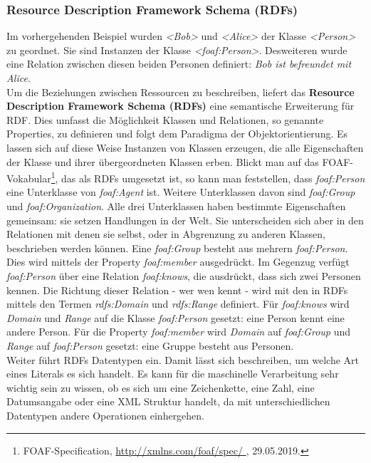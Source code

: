 \documentclass[12pt,a4paper]{article}
\begin{document}
\subsubsection{Resource Description Framework Schema (RDFs)}

Im vorhergehenden Beispiel wurden \textit{<Bob>} und \textit{<Alice>} der Klasse \textit{<Person>} zu geordnet. Sie sind Instanzen der Klasse \textit{<foaf:Person>}. Desweiteren wurde eine Relation zwischen diesen beiden Personen definiert: \textit{Bob ist befreundet mit Alice}.
\\
Um die Beziehungen zwischen Ressourcen zu beschreiben, liefert das \textbf{Resource Description Framework Schema (RDFs)} eine semantische Erweiterung für RDF. Dies umfasst die Möglichkeit Klassen und Relationen, so genannte Properties, zu definieren und folgt dem Paradigma der Objektorientierung. Es lassen sich auf diese Weise Instanzen von Klassen erzeugen, die alle Eigenschaften der Klasse und ihrer übergeordneten Klassen erben. Blickt man auf das FOAF-Vokabular\footnote{FOAF-Specification, \protect\url{http://xmlns.com/foaf/spec/ }, 29.05.2019.}, das als RDFs umgesetzt ist, so kann man feststellen, dass \textit{foaf:Person} eine Unterklasse von \textit{foaf:Agent} ist. Weitere Unterklassen davon sind \textit{foaf:Group} und \textit{foaf:Organization}. Alle drei Unterklassen haben bestimmte Eigenschaften gemeinsam: sie setzen Handlungen in der Welt. Sie unterscheiden sich aber in den Relationen mit denen sie selbst, oder in Abgrenzung zu anderen Klassen, beschrieben werden können. Eine \textit{foaf:Group} besteht aus mehrern \textit{foaf:Person}. Dies wird mittels der Property \textit{foaf:member} ausgedrückt. Im Gegenzug verfügt \textit{foaf:Person} über eine Relation \textit{foaf:knows}, die ausdrückt, dass sich zwei Personen kennen. Die Richtung dieser Relation - wer wen kennt - wird mit den in RDFs mittels den Termen \textit{rdfs:Domain} und \textit{rdfs:Range} definiert. 
Für \textit{foaf:knows} wird \textit{Domain} und \textit{Range} auf die Klasse\textit{ foaf:Person} gesetzt: eine Person kennt eine andere Person. Für die Property \textit{foaf:member} wird \textit{Domain} auf \textit{foaf:Group} und \textit{Range} auf \textit{foaf:Person} gesetzt: eine Gruppe besteht aus Personen.
\\
Weiter führt RDFs Datentypen ein. Damit lässt sich beschreiben, um welche Art eines Literals es sich handelt. Es kann für die maschinelle Verarbeitung sehr wichtig sein zu wissen, ob es sich um eine Zeichenkette, eine Zahl, eine Datumsangabe oder eine XML Struktur handelt, da mit unterschiedlichen Datentypen andere Operationen einhergehen. 
\end{document}
